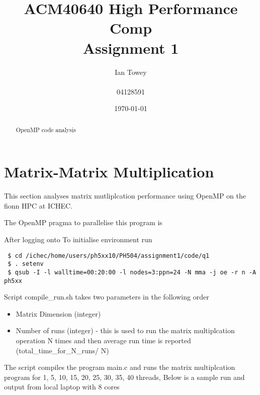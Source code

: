 \documentclass[a4paper]{article}
\title{ACM40640 High Performance Comp \\ Assignment 1}
\author{Ian Towey \\ \\ 04128591}
\date{\today}
\begin{document}
  \maketitle

  \begin{abstract}
    OpenMP code analysis
  \end{abstract}

\tableofcontents

\newpage
\section{Matrix-Matrix Multiplication}

This section analyses matrix mutliplcation performance using OpenMP on the fionn HPC at ICHEC. 

The OpenMP pragma to parallelise this program is


After logging onto To initialise environment run

\begin{verbatim}
 $ cd /ichec/home/users/ph5xx10/PH504/assignment1/code/q1
 $ . setenv
 $ qsub -I -l walltime=00:20:00 -l nodes=3:ppn=24 -N mma -j oe -r n -A ph5xx
\end{verbatim}

Script compile\_run.sh takes two parameters in the following order

\begin{itemize}
 \item Matrix Dimension (integer)
 \item Number of runs (integer) - this is used to run the matrix multiplcation operation N times and then average run time is reported (total\_time\_for\_N\_runs/ N)
\end{itemize}

The script compiles the program main.c and runs the matrix multiplcation program for 1, 5, 10, 15, 20, 25, 30, 35, 40 threads, Below is a sample run and output from local laptop with 8 cores
\end{document}
